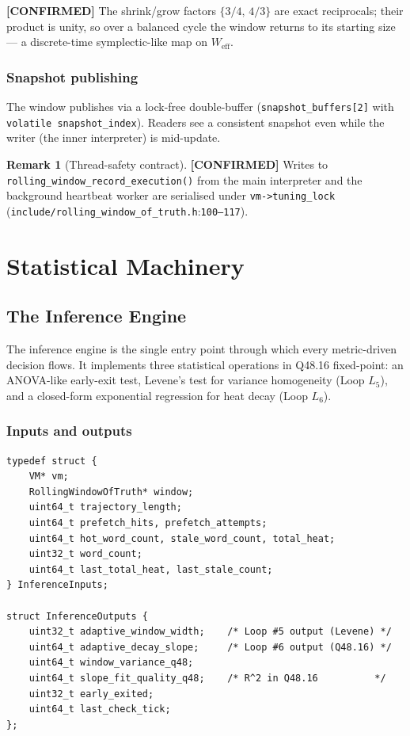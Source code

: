 \documentclass[11pt,letterpaper,openany]{book}
\theoremstyle{definition}
\newtheorem{remark}[definition]{Remark}
\theoremstyle{plain}
\newcommand{\confirmed}{\textcolor{green!50!black}{\textbf{[CONFIRMED]}}\xspace}
\newcommand{\Loop}[1]{L_{#1}}
\newcommand{\sourceref}[2]{\texttt{#1}:\texttt{#2}}
\begin{document}
\confirmed The shrink/grow factors $\{3/4,\,4/3\}$ are exact reciprocals;
their product is unity, so over a balanced cycle the window returns to its
starting size --- a discrete-time symplectic-like map on $W_{\mathrm{eff}}$.

\section{Snapshot publishing}

The window publishes via a lock-free double-buffer (\texttt{snapshot\_buffers[2]}
with \texttt{volatile snapshot\_index}). Readers see a consistent snapshot
even while the writer (the inner interpreter) is mid-update.

\begin{remark}[Thread-safety contract]
\confirmed Writes to \texttt{rolling\_window\_record\_execution()} from the
main interpreter and the background heartbeat worker are serialised under
\texttt{vm->tuning\_lock} (\sourceref{include/rolling\_window\_of\_truth.h}{100--117}).
\end{remark}

\part{Statistical Machinery}

\chapter{The Inference Engine}
\label{ch:inference}

The inference engine is the single entry point through which every
metric-driven decision flows. It implements three statistical operations
in Q48.16 fixed-point: an ANOVA-like early-exit test, Levene's test for
variance homogeneity (Loop $\Loop{5}$), and a closed-form exponential
regression for heat decay (Loop $\Loop{6}$).

\section{Inputs and outputs}

\begin{lstlisting}[caption={Inference inputs and outputs
  (\texttt{include/inference\_engine.h}:86--122).}]
typedef struct {
    VM* vm;
    RollingWindowOfTruth* window;
    uint64_t trajectory_length;
    uint64_t prefetch_hits, prefetch_attempts;
    uint64_t hot_word_count, stale_word_count, total_heat;
    uint32_t word_count;
    uint64_t last_total_heat, last_stale_count;
} InferenceInputs;

struct InferenceOutputs {
    uint32_t adaptive_window_width;    /* Loop #5 output (Levene) */
    uint64_t adaptive_decay_slope;     /* Loop #6 output (Q48.16) */
    uint64_t window_variance_q48;
    uint64_t slope_fit_quality_q48;    /* R^2 in Q48.16          */
    uint32_t early_exited;
    uint64_t last_check_tick;
};
\end{lstlisting}
\end{document}
